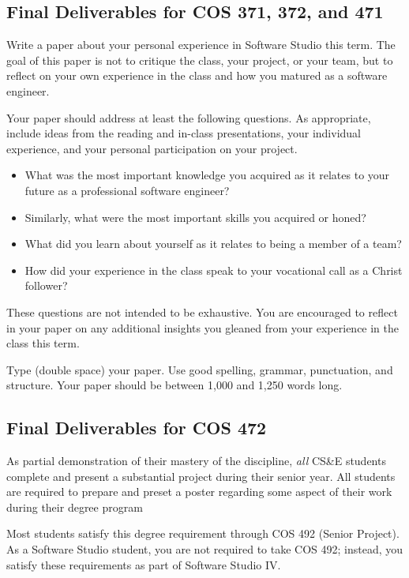 \documentclass{article}
\begin{document}
\subsection{Final Deliverables for COS 371, 372, and 471}
\label{sec:orgheadline17}
Write a paper about your personal experience in Software Studio this term. The goal of
this paper is not to critique the class, your project, or your team, but to reflect on
your own experience in the class and how you matured as a software engineer.

Your paper should address at least the following questions. As appropriate, include ideas
from the reading and in-class presentations, your individual experience, and your personal
participation on your project.
\begin{itemize}
\item What was the most important knowledge you acquired as it relates to your future as a
professional software engineer?
\item Similarly, what were the most important skills you acquired or honed?
\item What did you learn about yourself as it relates to being a member of a team?
\item How did your experience in the class speak to your vocational call as a Christ follower?
\end{itemize}

These questions are not intended to be exhaustive. You are encouraged to reflect in your
paper on any additional insights you gleaned from your experience in the class this term.

Type (double space) your paper. Use good spelling, grammar, punctuation, and
structure. Your paper should be between 1,000 and 1,250 words long.

\subsection{Final Deliverables for COS 472}
\label{sec:orgheadline18}
As partial demonstration of their mastery of the discipline,
\emph{all} CS\&E students complete and present a substantial project
during their senior year. All students are required to
prepare and preset a poster regarding some aspect of their work
during their degree program

Most students satisfy this degree requirement
through COS 492 (Senior Project).
As a Software Studio student, you are not required to take COS 492;
instead, you satisfy these requirements as part of Software Studio IV.
\end{document}
